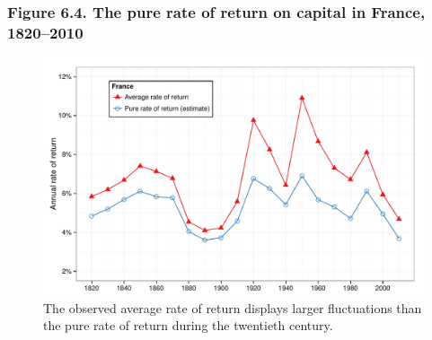 \documentclass[t]{beamer}\usepackage[]{graphicx}\usepackage[]{color}
\newenvironment{knitrout}{}{} %
\begin{document}
\begin{frame}[label=Figure_6_4]
\frametitle{Figure 6.4. The pure rate of return on capital in France, 1820--2010}
\begin{figure}[t]
\begin{minipage}[b]{\textwidth}
\centering
\begin{knitrout}\footnotesize
{}\color{fgcolor}

{\centering \includegraphics[width=1\linewidth]{figures/color/Figure_6_4} 

}



\end{knitrout}
\caption{The observed average rate of return displays larger fluctuations than the pure rate of return during the twentieth century.}
\end{minipage}
\end{figure}
\end{frame}
\end{document}
